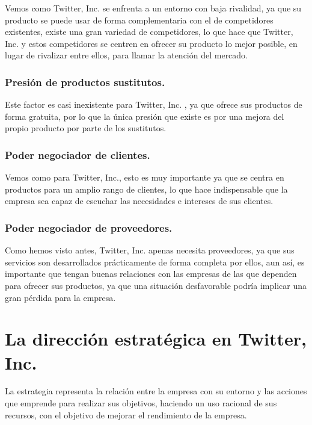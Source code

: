 Vemos como Twitter, Inc. se enfrenta a un entorno con baja rivalidad, ya que su producto se puede usar de forma complementaria con el de competidores existentes, existe una gran variedad de competidores, lo que hace que Twitter, Inc. y estos competidores se centren en ofrecer su producto lo mejor posible, en lugar de rivalizar entre ellos, para llamar la atención del mercado.

\subsubsection{Presión de productos sustitutos.}

Este factor es casi inexistente para Twitter, Inc. , ya que ofrece sus productos de forma gratuita, por lo que la única presión que existe es por una mejora del propio producto por parte de los sustitutos.

\subsubsection{Poder negociador de clientes.}

Vemos como para Twitter, Inc., esto es muy importante ya que se centra en productos para un amplio rango de clientes, lo que hace indispensable que la empresa sea capaz de escuchar las necesidades e intereses de sus clientes.

\subsubsection{Poder negociador de proveedores.}

Como hemos visto antes, Twitter, Inc. apenas necesita proveedores, ya que sus servicios son desarrollados prácticamente de forma completa por ellos, aun así, es importante que tengan buenas relaciones con las empresas de las que dependen para ofrecer sus productos, ya que una situación desfavorable podría implicar una gran pérdida para la empresa.


\newpage


\section{La dirección estratégica en Twitter, Inc.}

La estrategia representa la relación entre la empresa con su entorno y las acciones que emprende para realizar sus objetivos, haciendo un uso racional de sus recursos, con el objetivo de mejorar el rendimiento de la empresa.

